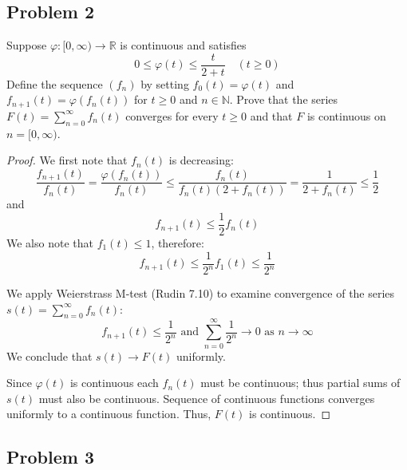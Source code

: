 \documentclass{article}
\begin{document}
\subsection*{Problem 2}

\begin{tcolorbox}
Suppose $\varphi : [0, \infty) \to \mathbb{R}$ is continuous and satisfies
$$ 0 \leq \varphi(t) \leq \frac{t}{2+t} \quad (t \geq 0)$$
Define the sequence $(f_n)$ by setting $f_0(t) = \varphi(t)$ and $f_{n+1}(t) = \varphi(f_n(t))$ for $t \geq 0$ and $n \in \mathbb{N}$.
Prove that the series $F(t) = \sum_{n=0}^{\infty} f_n(t)$ converges for every $t \geq 0$ and that $F$ is continuous on $n=[0, \infty)$.
\end{tcolorbox}
\begin{proof}
We first note that $f_n(t)$ is decreasing:
$$ \frac{f_{n+1}(t)}{f_n(t)} = \frac{\varphi(f_n(t))}{f_n(t)} \leq \frac{f_n(t)}{f_n(t)(2+f_n(t))} = \frac{1}{2+f_n(t)} \leq \frac{1}{2} $$
and 
$$ f_{n+1}(t) \leq \frac{1}{2} f_n(t) $$
We also note that $f_1(t) \leq 1$, therefore:
$$ f_{n+1}(t) \leq \frac{1}{2^n} f_1(t) \leq \frac{1}{2^n} $$

We apply Weierstrass M-test (Rudin 7.10) to examine convergence of the series $s(t) = \sum_{n=0}^{\infty} f_n(t)$:
$$ f_{n+1}(t) \leq \frac{1}{2^n} \text{ and $\sum_{n=0}^{\infty} \frac{1}{2^n} \to 0$ as $n \to \infty$} $$
We conclude that $s(t) \to F(t)$ uniformly.

Since $\varphi(t)$ is continuous each $f_n(t)$ must be continuous; thus partial sums of $s(t)$ must also be continuous. Sequence of continuous functions converges uniformly to a continuous function. Thus, $F(t)$ is continuous.
\end{proof}


\subsection*{Problem 3}
\end{document}
